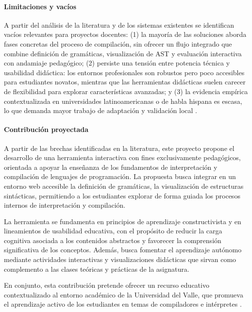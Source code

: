

\paragraph{Limitaciones y vacíos} 
A partir del análisis de la literatura y de los sistemas existentes se identifican vacíos relevantes para proyectos docentes: 
(1) la mayoría de las soluciones aborda fases concretas del proceso de compilación, sin ofrecer un flujo integrado que combine definición de gramáticas, visualización de AST y evaluación interactiva con andamiaje pedagógico; 
(2) persiste una tensión entre potencia técnica y usabilidad didáctica: los entornos profesionales son robustos pero poco accesibles para estudiantes novatos, mientras que las herramientas didácticas suelen carecer de flexibilidad para explorar características avanzadas; 
y (3) la evidencia empírica contextualizada en universidades latinoamericanas o de habla hispana es escasa, lo que demanda mayor trabajo de adaptación y validación local \cite{lu2022usability, jovanovic2021comvis,daleman2024chocopy}.

\paragraph{Contribución proyectada} 
A partir de las brechas identificadas en la literatura, este proyecto propone el desarrollo de una herramienta interactiva con fines exclusivamente pedagógicos, orientada a apoyar la enseñanza de los fundamentos de interpretación y compilación de lenguajes de programación. La propuesta busca integrar en un entorno web accesible la definición de gramáticas, la visualización de estructuras sintácticas, permitiendo a los estudiantes explorar de forma guiada los procesos internos de interpretación y compilación.

La herramienta se fundamenta en principios de aprendizaje constructivista y en lineamientos de usabilidad educativa, con el propósito de reducir la carga cognitiva asociada a los contenidos abstractos y favorecer la comprensión significativa de los conceptos. Además, busca fomentar el aprendizaje autónomo mediante actividades interactivas y visualizaciones didácticas que sirvan como complemento a las clases teóricas y prácticas de la asignatura.

En conjunto, esta contribución pretende ofrecer un recurso educativo contextualizado al entorno académico de la Universidad del Valle, que promueva el aprendizaje activo de los estudiantes en temas de compiladores e intérpretes \cite{delvado2023itt, lu2022usability, jovanovic2021comvis}.

